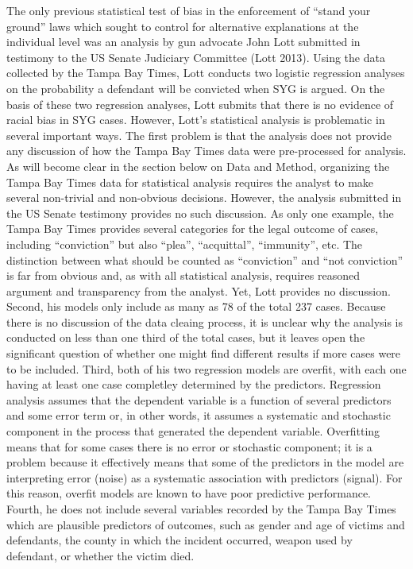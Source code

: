 \documentclass[12pt,article]{article}
\begin{document}
The only previous statistical test of bias in the enforcement of ``stand
your ground'' laws which sought to control for alternative explanations
at the individual level was an analysis by gun advocate John Lott
submitted in testimony to the US Senate Judiciary Committee (Lott 2013).
Using the data collected by the Tampa Bay Times, Lott conducts two
logistic regression analyses on the probability a defendant will be
convicted when SYG is argued. On the basis of these two regression
analyses, Lott submits that there is no evidence of racial bias in SYG
cases. However, Lott's statistical analysis is problematic in several
important ways. The first problem is that the analysis does not provide
any discussion of how the Tampa Bay Times data were pre-processed for
analysis. As will become clear in the section below on Data and Method,
organizing the Tampa Bay Times data for statistical analysis requires
the analyst to make several non-trivial and non-obvious decisions.
However, the analysis submitted in the US Senate testimony provides no
such discussion. As only one example, the Tampa Bay Times provides
several categories for the legal outcome of cases, including
``conviction'' but also ``plea'', ``acquittal'', ``immunity'', etc. The
distinction between what should be counted as ``conviction'' and ``not
conviction'' is far from obvious and, as with all statistical analysis,
requires reasoned argument and transparency from the analyst. Yet, Lott
provides no discussion. Second, his models only include as many as 78 of
the total 237 cases. Because there is no discussion of the data cleaing
process, it is unclear why the analysis is conducted on less than one
third of the total cases, but it leaves open the significant question of
whether one might find different results if more cases were to be
included. Third, both of his two regression models are overfit, with
each one having at least one case completley determined by the
predictors. Regression analysis assumes that the dependent variable is a
function of several predictors and some error term or, in other words,
it assumes a systematic and stochastic component in the process that
generated the dependent variable. Overfitting means that for some cases
there is no error or stochastic component; it is a problem because it
effectively means that some of the predictors in the model are
interpreting error (noise) as a systematic association with predictors
(signal). For this reason, overfit models are known to have poor
predictive performance. Fourth, he does not include several variables
recorded by the Tampa Bay Times which are plausible predictors of
outcomes, such as gender and age of victims and defendants, the county
in which the incident occurred, weapon used by defendant, or whether the
victim died.
\end{document}

